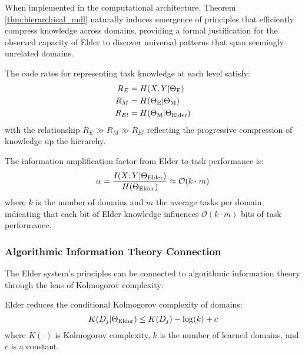 \begin{theorem}
When implemented in the computational architecture, Theorem \ref{thm:hierarchical_mdl} naturally induces emergence of principles that efficiently compress knowledge across domains, providing a formal justification for the observed capacity of Elder to discover universal patterns that span seemingly unrelated domains.
\end{theorem}

\begin{proposition}
The code rates for representing task knowledge at each level satisfy:
\begin{align}
R_E &= H(X, Y | \Theta_{\text{E}}) \\
R_M &= H(\Theta_{\text{E}} | \Theta_{\text{M}}) \\
R_{El} &= H(\Theta_{\text{M}} | \Theta_{\text{Elder}})
\end{align}
with the relationship $R_E \gg R_M \gg R_{El}$ reflecting the progressive compression of knowledge up the hierarchy.
\end{proposition}

\begin{corollary}
The information amplification factor from Elder to task performance is:
\begin{equation}
\alpha = \frac{I(X; Y | \Theta_{\text{Elder}})}{H(\Theta_{\text{Elder}})} \approx \mathcal{O}(k \cdot m)
\end{equation}
where $k$ is the number of domains and $m$ the average tasks per domain, indicating that each bit of Elder knowledge influences $\mathcal{O}(k \cdot m)$ bits of task performance.
\end{corollary}

\subsubsection{Algorithmic Information Theory Connection}

The Elder system's principles can be connected to algorithmic information theory through the lens of Kolmogorov complexity:

\begin{theorem}
Elder reduces the conditional Kolmogorov complexity of domains:
\begin{equation}
K(D_j | \Theta_{\text{Elder}}) \leq K(D_j) - \log(k) + c
\end{equation}
where $K(\cdot)$ is Kolmogorov complexity, $k$ is the number of learned domains, and $c$ is a constant.
\end{theorem}

